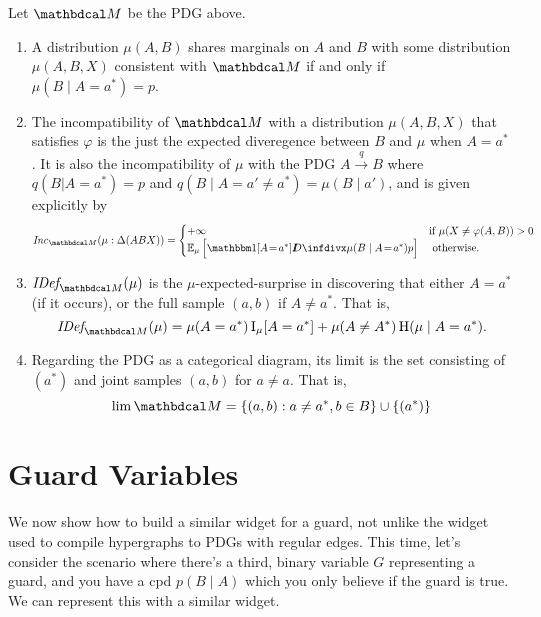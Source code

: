 \documentclass{article}
\begin{document}
	
		\begin{prop}
			\label{prop:sem1}
		Let $\dg M$ be the PDG above.
		\begin{enumerate}
			\item 
				A distribution $\mu(A,B)$ shares marginals on $A$ and $B$ with some distribution $\mu(A,B,X)$ consistent with $\dg M$ if and only if $\mu(B \mid A = a^*) = p$.
			\item The incompatibility of $\dg M$ with a distribution $\mu(A,B,X)$ that satisfies $\varphi$ is the just the expected diveregence between $B$ and $\mu$ when $A = a^*$. It is also the incompatibility of $\mu$ with the PDG $A \xrightarrow{q} B$ where $q(B|A = a^*) = p$ and $q(B \mid A = a'\ne a^*) = \mu(B\mid a')$, and is given explicitly by
				\[ \Inc_{\dg M}(\mu:\Delta(ABX)) = \begin{cases}
					+\infty& \text{if~}\mu(X \ne \varphi(A,B)) >0 \\
					\Ex_\mu \Big[ \mathbbm1[{A\!=\!a^*}]  \kldiv{\mu(B\mid A\!=\!a^*)}{p} \Big] & \text{~otherwise.}
				\end{cases} \]
			
			\item $\IDef{\dg M}(\mu)$ is the $\mu$-expected-surprise in discovering that either $A= a^*$ (if it occurs), or the full sample $(a,b)$ if $A \ne a^*$. That is,
				\[ \IDef{\dg M}(\mu) =  \mu(A = a^*) \I_\mu[A = a^*] + \mu(A \ne A^*) \H(\mu \mid A = a^*). \]
			
			\item Regarding the PDG as a categorical diagram, its limit is the set consisting of $(a^*)$ and joint samples $(a,b)$ for $a \ne a$.  That is, 
			\[ \lim \dg M = \{(a,b) : a \ne a^*, b \in B\} \cup \{ (a^*) \} \]
		\end{enumerate}
	\end{prop}
	\medskip
	\clearpage
	\section{Guard Variables}
	
	We now show how to build a similar widget for a guard, not unlike the widget used to compile hypergraphs to PDGs with regular edges. This time, let's consider the scenario where there's a third, binary variable $G$ representing a guard, and you have a cpd $p(B \mid A) $ which you only believe if the guard is true. We can represent this with a similar widget.
	
\end{document}
